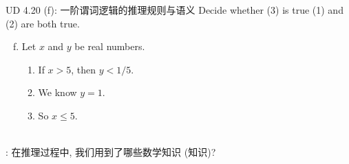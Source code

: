 \begin{frame}{}
  \begin{exampleblock}{UD 4.20 (f): 一阶谓词逻辑的推理规则与语义}
    Decide whether (3) is true  (1) and (2) are both true.

    \begin{enumerate}[(a)]
      \setcounter{enumi}{5}
      \item Let $x$ and $y$ be real numbers.
	\begin{enumerate}[(1)]
	  \item If $x > 5$, then $y < 1/5$.
	  \item We know $y = 1$.
	  \item So $x \le 5$.
	\end{enumerate}
    \end{enumerate}
  \end{exampleblock}

  \pause
  \vspace{0.30cm}
  \begin{center}
    {} \\[15pt] \pause
    {: 在推理过程中, 我们用到了哪些数学知识 (知识)?}
  \end{center}
\end{frame}

